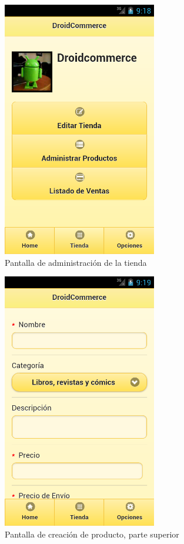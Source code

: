 \begin{figure}
  \centering
    \includegraphics[width=0.6\textwidth]{imagenes/capturas/administracion-tienda.png}
        \caption{Pantalla de administración de la tienda}
    \label{fig:admin-tienda}
\end{figure}


\begin{figure}
  \centering
    \includegraphics[width=0.6\textwidth]{imagenes/capturas/crear-producto1.png}
        \caption{Pantalla de creación de producto, parte superior}
    \label{fig:crear-producto-1}
\end{figure}


